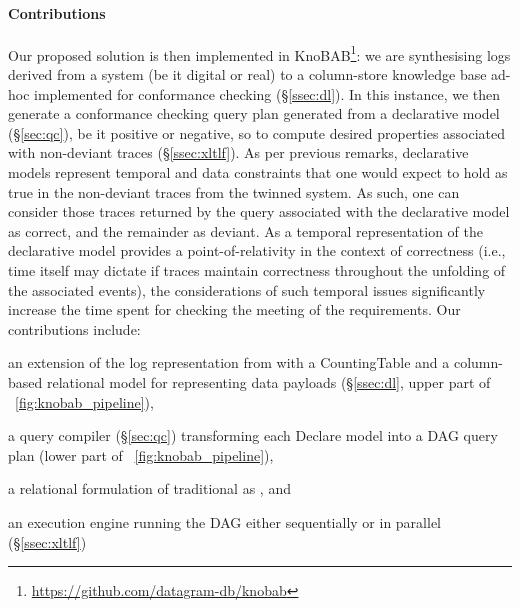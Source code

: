 \paragraph*{Contributions} Our proposed solution is then implemented in KnoBAB\footnote{\url{https://github.com/datagram-db/knobab}}: we are synthesising logs derived from a system (be it digital or real) to a column-store knowledge base ad-hoc implemented for conformance checking (\S\ref{ssec:dl}). In this instance, we then generate a conformance checking query plan generated from a declarative model (\S\ref{sec:qc}), be it positive or negative, so to compute desired properties associated with non-deviant traces (\S\ref{ssec:xltlf}). As per previous remarks, declarative models represent temporal and data constraints that one would expect to hold as true in the non-deviant traces from the twinned system. As such, one can consider those traces returned by the query associated with the declarative model as correct, and the remainder as deviant. As a temporal representation of the declarative model provides a point-of-relativity in the context of correctness (i.e., time itself may dictate if traces maintain correctness throughout the unfolding of the associated events), the considerations of such temporal issues significantly increase the time spent for checking the meeting of the requirements.  Our contributions include: 
{\begin{enumerate*}[label=(\textit{\roman*})]
	\item an extension of the log representation from \cite{Schonig15,SchonigRCJM16} with a \textsf{CountingTable} and a column-based relational model for representing data payloads (\S\ref{ssec:dl}, upper part of \figurename~\ref{fig:knobab_pipeline}),
	\item a query compiler (\S\ref{sec:qc}) transforming each Declare model into a DAG query plan (lower part of \figurename~\ref{fig:knobab_pipeline}),
	\item a relational formulation of traditional \LTLf as \xLTLf, and
	\item an execution engine running the DAG either sequentially or in parallel (\S\ref{ssec:xltlf})
\end{enumerate*}}

